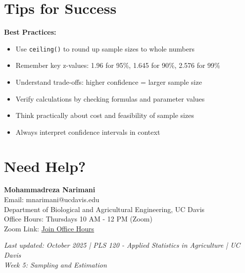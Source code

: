 \documentclass[11pt,a4paper]{article}
\begin{document}
\section{Tips for Success}

\begin{warningbox}
\textbf{Best Practices:}
\begin{itemize}
    \item Use \texttt{ceiling()} to round up sample sizes to whole numbers
    \item Remember key z-values: 1.96 for 95\%, 1.645 for 90\%, 2.576 for 99\%
    \item Understand trade-offs: higher confidence = larger sample size
    \item Verify calculations by checking formulas and parameter values
    \item Think practically about cost and feasibility of sample sizes
    \item Always interpret confidence intervals in context
\end{itemize}
\end{warningbox}

\section{Need Help?}

\begin{infobox}
\textbf{Mohammadreza Narimani}\\
Email: mnarimani@ucdavis.edu\\
Department of Biological and Agricultural Engineering, UC Davis\\
Office Hours: Thursdays 10 AM - 12 PM (Zoom)\\
Zoom Link: \href{https://ucdavis.zoom.us/j/99533096447}{Join Office Hours}
\end{infobox}

\vfill

\begin{center}
\textit{Last updated: October 2025 | PLS 120 - Applied Statistics in Agriculture | UC Davis}\\
\textit{Week 5: Sampling and Estimation}
\end{center}
\end{document}
